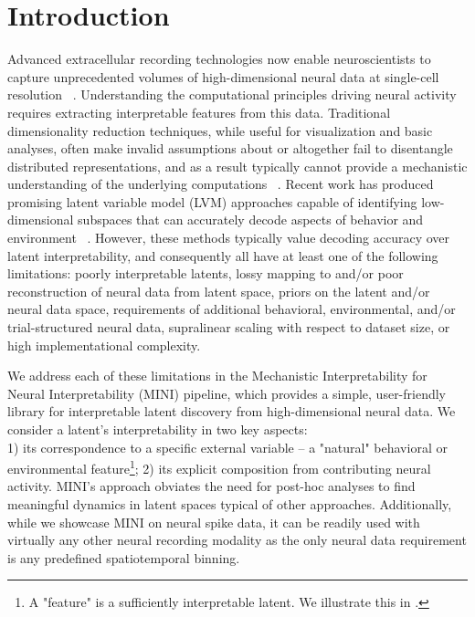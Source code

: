 \section{Introduction}

Advanced extracellular recording technologies now enable neuroscientists to capture unprecedented volumes of high-dimensional neural data at single-cell resolution ~\cite{steinmetz_2021_neuropixels2, raducanu_2017_neuroseeker, cai_2016_miniscope, villette_2019_voltage_2p, ouzounov_2017_three_photon, ahrens_2013_lightsheet}. Understanding the computational principles driving neural activity requires extracting interpretable features from this data. Traditional dimensionality reduction techniques, while useful for visualization and basic analyses, often make invalid assumptions about or altogether fail to disentangle distributed representations, and as a result typically cannot provide a mechanistic understanding of the underlying computations ~\cite{cunningham_2014_neural_dr, humphries_2021_dr_principles}. Recent work has produced promising latent variable model (LVM) approaches capable of identifying low-dimensional subspaces that can accurately decode aspects of behavior and environment ~\cite{song_2025_langevinflow, schneider_2023_cebra, le_2022_stndt, keshtkaran_2022_autolfads, yu_2009_gpfa, macke_2011_plds, gao_2016_pflds, low_2018_mind, jensen_2020_mgplvm, hernandez_2020_vind, kim_2021_plnde, hurwitz_2021_tndm, schimel_2022_ilqrvae, kudryashova_2023_ctrltndm, ye_2023_ndt2, gondur_2024_mmgpvae, pellegrino_2024_slicetca, sani_2024_dpad, pals_2024_smclr_rnn, zhang_2024_mtm, george_2025_simpl, perkins_2025_mint, schmutz_2025_nce}. However, these methods typically value decoding accuracy over latent interpretability, and consequently all have at least one of the following limitations: poorly interpretable latents, lossy mapping to and/or poor reconstruction of neural data from latent space, priors on the latent and/or neural data space, requirements of additional behavioral, environmental, and/or trial-structured neural data, supralinear scaling with respect to dataset size, or high implementational complexity.

We address each of these limitations in the Mechanistic Interpretability for Neural Interpretability (MINI) pipeline, which provides a simple, user-friendly library for interpretable latent discovery from high-dimensional neural data. We consider a latent's interpretability in two key aspects: \\ 1) its correspondence to a specific external variable -- a "natural" behavioral or environmental feature\footnote{A "feature" is a sufficiently interpretable latent. We illustrate this in .}; 2) its explicit composition from contributing neural activity. MINI's approach obviates the need for post-hoc analyses to find meaningful dynamics in latent spaces typical of other approaches. Additionally, while we showcase MINI on neural spike data, it can be readily used with virtually any other neural recording modality as the only neural data requirement is any predefined spatiotemporal binning.

